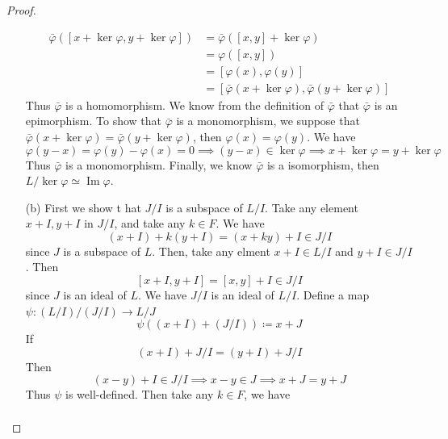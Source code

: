 \documentclass[../main.tex]{subfiles}
\begin{document}
\begin{proof}
\begin{enumerate}
\[\begin{aligned}
           \bar{\varphi}\left( [x+ \operatorname{ker} \varphi ,y+ \operatorname{ker} \varphi ] \right) &=   \bar{\varphi}\left( [x,y]+ \operatorname{ker} \varphi  \right)\\ 
            &=  \varphi \left( [x,y] \right)\\ 
             &=  [\varphi \left( x \right), \varphi \left( y \right)]\\ 
              &=     [ \bar{\varphi}\left( x+ \operatorname{ker} \varphi  \right), \bar{\varphi}\left( y+ \operatorname{ker} \varphi  \right)  ]
          \end{aligned}
          \] Thus \(   \bar{\varphi}  \) is a homomorphism.  We know from the definition of \(   \bar{\varphi}  \) that \(   \bar{\varphi}  \) is an epimorphism.  To show that \(   \bar{\varphi}  \) is a monomorphism, we suppose that \(   \bar{\varphi}\left( x+ \operatorname{ker} \varphi  \right)=  \bar{\varphi}\left( y+ \operatorname{ker} \varphi  \right)    \), then \(   \varphi \left( x \right)=  \varphi \left( y \right)    \). We have \[
           \varphi \left( y-x \right)=  \varphi  \left( y \right)- \varphi \left( x \right)= 0 \implies   \left( y-x \right)\in \operatorname{ker} \varphi     \implies x+ \operatorname{ker} \varphi = y+ \operatorname{ker} \varphi 
          \]Thus \(   \bar{\varphi}  \) is a monomorphism. Finally, we know \(   \bar{\varphi}  \) is a isomorphism, then \(  L/\operatorname{ker} \varphi \simeq \operatorname{Im} \varphi   \).      
          \item[(b)] First we show t hat \(  J /I  \) is a subspace of \(  L / I  \). Take any element \(  x+ I, y+ I  \) in \(  J/I  \), and take any \(  k \in F  \). We have \[
          \left( x+ I \right)+ k\left( y+ I \right)= \left( x+ ky \right)+ I   \in  J/I
          \]since \(  J  \) is a subspace of \(  L  \). Then,       take any elment \(  x+ I\in L/I  \) and \(  y+  I \in  J/I  \). Then \[
          [x+ I,y+ I]= [x,y]+ I \in J / I
          \]  since \(  J  \) is an ideal of \(  L  \).  We have \(  J/I  \) is an ideal of \(  L/I  \).  Define a map  \(  \psi : \left( L  / I \right)/\left( J / I \right)\to L / J    \) \[
          \psi \left( \left( x+ I \right)+ \left( J/I \right)   \right)\coloneqq x+ J 
          \] If \[
          \left( x+ I \right)+ J/I= \left( y+ I \right)+  J / I  
          \]Then \[
          \left( x-y \right)+ I\in J/I\implies  x-y\in J\implies x+ J= y+ J 
          \]Thus \(  \psi   \) is well-defined. Then take any \(  k \in F  \), we have \[
         \begin{aligned}

\end{aligned}\]
\end{enumerate}
\end{proof}
\end{document}
